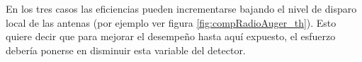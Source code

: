 	En los tres casos las eficiencias pueden incrementarse bajando el nivel de disparo local de las antenas (por ejemplo ver figura \ref{fig:compRadioAuger_th}). 
	Esto quiere decir que para mejorar el desempe\~no hasta aqu\'i expuesto, el esfuerzo deber\'ia ponerse en disminuir esta variable del detector.
	
	
	

	

	